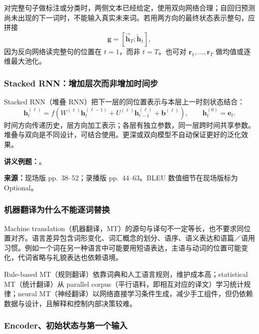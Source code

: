 对完整句子做标注或分类时，两侧文本已经给定，使用双向网络合理；自回归预测尚未出现的下一词时，不能输入真实未来词。若用两方向的最终状态表示整句，应拼接
\[
 \boxed{\mathbf g=[\overrightarrow{\mathbf h}_T;\overleftarrow{\mathbf h}_1]},
\]
因为反向网络读完整句的位置在 $t=1$，而非 $t=T$。也可对 $\mathbf r_1,\ldots,\mathbf r_T$ 做均值或逐维最大池化。

\subsubsection{Stacked RNN：增加层次而非增加时间步}

Stacked RNN（堆叠 RNN）把下一层的同位置表示与本层上一时刻状态结合：
\[
 \mathbf h_t^{(\ell)}=
 f\!\left(W^{(\ell)}\mathbf h_t^{(\ell-1)}
          +U^{(\ell)}\mathbf h_{t-1}^{(\ell)}+\mathbf b^{(\ell)}\right),
 \qquad\mathbf h_t^{(0)}=\mathbf e_t.
\]
时间方向传递历史，层方向加工表示；各层有独立参数，同一层跨时间共享参数。堆叠与双向是不同设计，可结合使用。更深或双向模型不自动保证更好的泛化效果。

\textbf{讲义例题：}。

\nopagebreak[4]
\textbf{来源：}现场版 pp.~38--52；录播版 pp.~44--63。BLEU 数值细节在现场版标为 Optional。
\nopagebreak[4]

\subsubsection{机器翻译为什么不能逐词替换}

Machine translation（机器翻译，MT）的源句与译句不一定等长，也不要求同位置对齐。语言差异包含词形变化、词汇概念的划分、语序、语义表达和语篇／语用习惯。例如一个词在另一种语言中可能要用短语表达，主语与动词的位置可能变化，代词省略与礼貌表达也依赖语境。

Rule-based MT（规则翻译）依靠词典和人工语言规则，维护成本高；statistical MT（统计翻译）从 parallel corpus（平行语料，即相互对应的译文）学习统计规律；neural MT（神经翻译）以网络直接学习条件生成，减少手工组件，但仍依赖数据与设计，且解释和控制内部决策较难。

\subsubsection{Encoder、初始状态与第一个输入}

